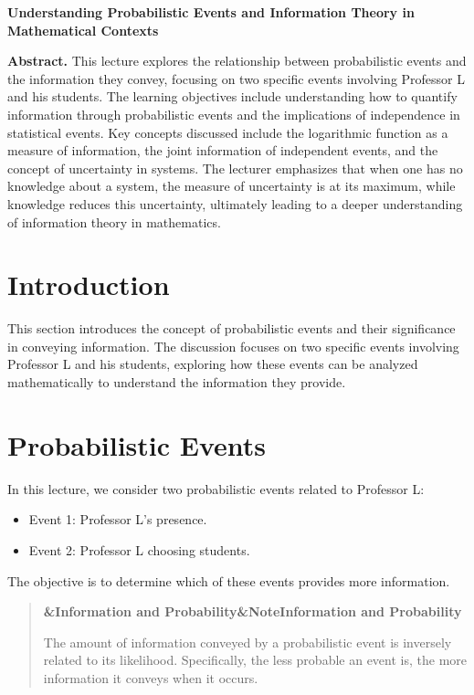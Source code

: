 \documentclass[a4paper]{article}
\newcommand{\boxheading}[1]{%
  \par\smallskip
  \noindent\textbf{\ifx&#1&Note\else#1\fi}\par
  \smallskip
}
\newenvironment{rembox}[1][]{%
  \begin{quote}\color{black!70}\boxheading{#1}\normalcolor
}{\end{quote}}
\begin{document}
\begin{center}
{\LARGE \textbf{Understanding Probabilistic Events and Information Theory in Mathematical Contexts}}\\[1em]
\end{center}

\textbf{Abstract.} This lecture explores the relationship between probabilistic events and the information they convey, focusing on two specific events involving Professor L and his students. The learning objectives include understanding how to quantify information through probabilistic events and the implications of independence in statistical events. Key concepts discussed include the logarithmic function as a measure of information, the joint information of independent events, and the concept of uncertainty in systems. The lecturer emphasizes that when one has no knowledge about a system, the measure of uncertainty is at its maximum, while knowledge reduces this uncertainty, ultimately leading to a deeper understanding of information theory in mathematics.

\section{Introduction}
This section introduces the concept of probabilistic events and their significance in conveying information. The discussion focuses on two specific events involving Professor L and his students, exploring how these events can be analyzed mathematically to understand the information they provide.

\section{Probabilistic Events}
In this lecture, we consider two probabilistic events related to Professor L:

\begin{itemize}
    \item Event 1: Professor L's presence.
    \item Event 2: Professor L choosing students.
\end{itemize}

The objective is to determine which of these events provides more information. 

\begin{rembox}[Information and Probability]
The amount of information conveyed by a probabilistic event is inversely related to its likelihood. Specifically, the less probable an event is, the more information it conveys when it occurs.
\end{rembox}
\end{document}
